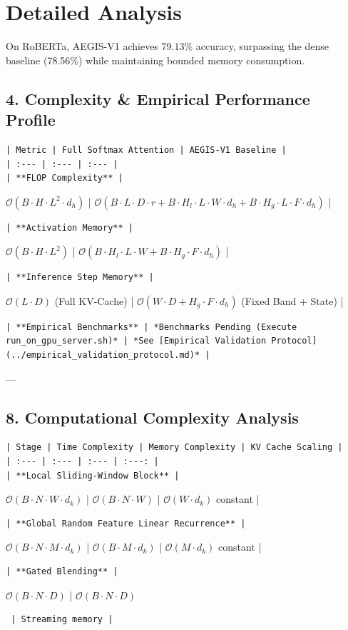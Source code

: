 \section{Detailed Analysis}On RoBERTa, AEGIS-V1 achieves 79.13\% accuracy, surpassing the dense baseline (78.56\%) while maintaining bounded memory consumption.



\subsection{4. Complexity \& Empirical Performance Profile}
\begin{verbatim}
| Metric | Full Softmax Attention | AEGIS-V1 Baseline |
| :--- | :--- | :--- |
| **FLOP Complexity** | 
\end{verbatim}$\mathcal{O}(B \cdot H \cdot L^2 \cdot d_h)$ | $\mathcal{O}(B \cdot L \cdot D \cdot r + B \cdot H_l \cdot L \cdot W \cdot d_h + B \cdot H_g \cdot L \cdot F \cdot d_h)$ |
\begin{verbatim}
| **Activation Memory** | 
\end{verbatim}$\mathcal{O}(B \cdot H \cdot L^2)$ | $\mathcal{O}(B \cdot H_l \cdot L \cdot W + B \cdot H_g \cdot F \cdot d_h)$ |
\begin{verbatim}
| **Inference Step Memory** | 
\end{verbatim}$\mathcal{O}(L \cdot D)$ (Full KV-Cache) | $\mathcal{O}(W \cdot D + H_g \cdot F \cdot d_h)$ (Fixed Band + State) |
\begin{verbatim}
| **Empirical Benchmarks** | *Benchmarks Pending (Execute run_on_gpu_server.sh)* | *See [Empirical Validation Protocol](../empirical_validation_protocol.md)* |
\end{verbatim}

---

\subsection{8. Computational Complexity Analysis}
\begin{verbatim}
| Stage | Time Complexity | Memory Complexity | KV Cache Scaling |
| :--- | :--- | :--- | :---: |
| **Local Sliding-Window Block** | 
\end{verbatim}$\mathcal{O}(B \cdot N \cdot W \cdot d_k)$ | $\mathcal{O}(B \cdot N \cdot W)$ | $\mathcal{O}(W \cdot d_k)$ constant |
\begin{verbatim}
| **Global Random Feature Linear Recurrence** | 
\end{verbatim}$\mathcal{O}(B \cdot N \cdot M \cdot d_k)$ | $\mathcal{O}(B \cdot M \cdot d_k)$ | $\mathcal{O}(M \cdot d_k)$ constant |
\begin{verbatim}
| **Gated Blending** | 
\end{verbatim}$\mathcal{O}(B \cdot N \cdot D)$ | $\mathcal{O}(B \cdot N \cdot D)$\begin{verbatim}
 | Streaming memory |
\end{verbatim}

